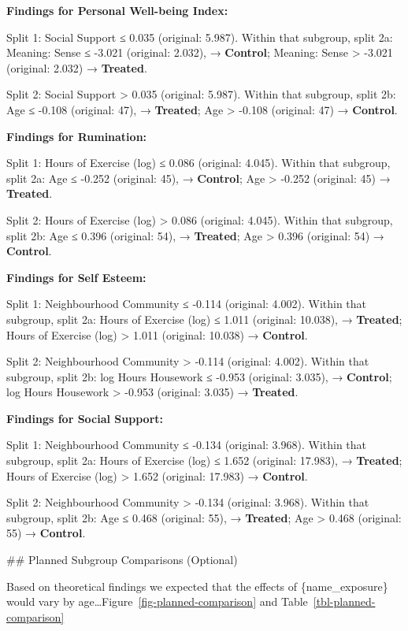 \documentclass[
  single column]{article}
\begin{document}
\textbf{Findings for Personal Well-being Index:}

Split 1: Social Support ≤ 0.035 (original: 5.987). Within that subgroup,
split 2a: Meaning: Sense ≤ -3.021 (original: 2.032), → \textbf{Control};
Meaning: Sense \textgreater{} -3.021 (original: 2.032) →
\textbf{Treated}.

Split 2: Social Support \textgreater{} 0.035 (original: 5.987). Within
that subgroup, split 2b: Age ≤ -0.108 (original: 47), →
\textbf{Treated}; Age \textgreater{} -0.108 (original: 47) →
\textbf{Control}.

\textbf{Findings for Rumination:}

Split 1: Hours of Exercise (log) ≤ 0.086 (original: 4.045). Within that
subgroup, split 2a: Age ≤ -0.252 (original: 45), → \textbf{Control}; Age
\textgreater{} -0.252 (original: 45) → \textbf{Treated}.

Split 2: Hours of Exercise (log) \textgreater{} 0.086 (original: 4.045).
Within that subgroup, split 2b: Age ≤ 0.396 (original: 54), →
\textbf{Treated}; Age \textgreater{} 0.396 (original: 54) →
\textbf{Control}.

\textbf{Findings for Self Esteem:}

Split 1: Neighbourhood Community ≤ -0.114 (original: 4.002). Within that
subgroup, split 2a: Hours of Exercise (log) ≤ 1.011 (original: 10.038),
→ \textbf{Treated}; Hours of Exercise (log) \textgreater{} 1.011
(original: 10.038) → \textbf{Control}.

Split 2: Neighbourhood Community \textgreater{} -0.114 (original:
4.002). Within that subgroup, split 2b: log Hours Housework ≤ -0.953
(original: 3.035), → \textbf{Control}; log Hours Housework
\textgreater{} -0.953 (original: 3.035) → \textbf{Treated}.

\textbf{Findings for Social Support:}

Split 1: Neighbourhood Community ≤ -0.134 (original: 3.968). Within that
subgroup, split 2a: Hours of Exercise (log) ≤ 1.652 (original: 17.983),
→ \textbf{Treated}; Hours of Exercise (log) \textgreater{} 1.652
(original: 17.983) → \textbf{Control}.

Split 2: Neighbourhood Community \textgreater{} -0.134 (original:
3.968). Within that subgroup, split 2b: Age ≤ 0.468 (original: 55), →
\textbf{Treated}; Age \textgreater{} 0.468 (original: 55) →
\textbf{Control}.

\newpage{} \#\# Planned Subgroup Comparisons (Optional)

Based on theoretical findings we expected that the effects of
\{name\_exposure\} would vary by
age\ldots{}Figure~\ref{fig-planned-comparison} and
Table~\ref{tbl-planned-comparison}
\end{document}
